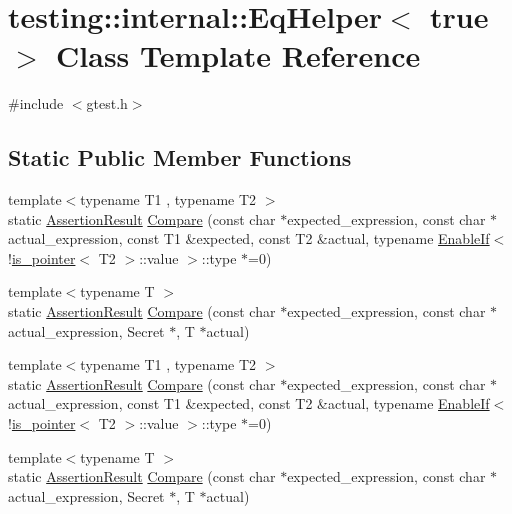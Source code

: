 \hypertarget{classtesting_1_1internal_1_1_eq_helper_3_01true_01_4}{\section{testing\-:\-:internal\-:\-:Eq\-Helper$<$ true $>$ Class Template Reference}
\label{classtesting_1_1internal_1_1_eq_helper_3_01true_01_4}
}


{\ttfamily \#include $<$gtest.\-h$>$}

\subsection*{Static Public Member Functions}
\begin{DoxyCompactItemize}
\item 
{\footnotesize template$<$typename T1 , typename T2 $>$ }\\static \hyperlink{classtesting_1_1_assertion_result}{Assertion\-Result} \hyperlink{classtesting_1_1internal_1_1_eq_helper_3_01true_01_4_a70d6d7e3cb1df06ad6114f25e843fd6d}{Compare} (const char $\ast$expected\-\_\-expression, const char $\ast$actual\-\_\-expression, const T1 \&expected, const T2 \&actual, typename \hyperlink{structtesting_1_1internal_1_1_enable_if}{Enable\-If}$<$!\hyperlink{structtesting_1_1internal_1_1is__pointer}{is\-\_\-pointer}$<$ T2 $>$\-::value $>$\-::type $\ast$=0)
\item 
{\footnotesize template$<$typename T $>$ }\\static \hyperlink{classtesting_1_1_assertion_result}{Assertion\-Result} \hyperlink{classtesting_1_1internal_1_1_eq_helper_3_01true_01_4_ab38e840297adb48f18767a1a99187fb3}{Compare} (const char $\ast$expected\-\_\-expression, const char $\ast$actual\-\_\-expression, Secret $\ast$, T $\ast$actual)
\item 
{\footnotesize template$<$typename T1 , typename T2 $>$ }\\static \hyperlink{classtesting_1_1_assertion_result}{Assertion\-Result} \hyperlink{classtesting_1_1internal_1_1_eq_helper_3_01true_01_4_a70d6d7e3cb1df06ad6114f25e843fd6d}{Compare} (const char $\ast$expected\-\_\-expression, const char $\ast$actual\-\_\-expression, const T1 \&expected, const T2 \&actual, typename \hyperlink{structtesting_1_1internal_1_1_enable_if}{Enable\-If}$<$!\hyperlink{structtesting_1_1internal_1_1is__pointer}{is\-\_\-pointer}$<$ T2 $>$\-::value $>$\-::type $\ast$=0)
\item 
{\footnotesize template$<$typename T $>$ }\\static \hyperlink{classtesting_1_1_assertion_result}{Assertion\-Result} \hyperlink{classtesting_1_1internal_1_1_eq_helper_3_01true_01_4_ab38e840297adb48f18767a1a99187fb3}{Compare} (const char $\ast$expected\-\_\-expression, const char $\ast$actual\-\_\-expression, Secret $\ast$, T $\ast$actual)
\end{DoxyCompactItemize}


